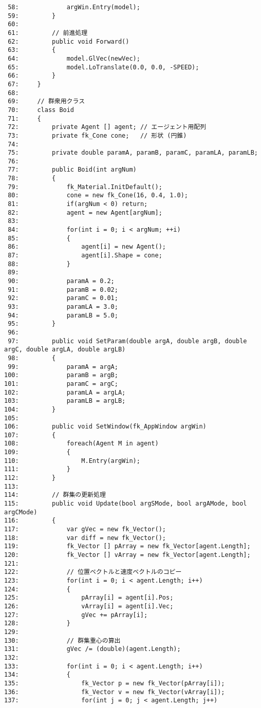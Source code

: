 \begin{breakbox}
\begin{small}
\begin{verbatim}
 58:             argWin.Entry(model);
 59:         }
 60: 
 61:         // 前進処理
 62:         public void Forward()
 63:         {
 64:             model.GlVec(newVec);
 65:             model.LoTranslate(0.0, 0.0, -SPEED);
 66:         }
 67:     }
 68: 
 69:     // 群衆用クラス
 70:     class Boid
 71:     {
 72:         private Agent [] agent; // エージェント用配列
 73:         private fk_Cone cone;   // 形状 (円錐)
 74: 
 75:         private double paramA, paramB, paramC, paramLA, paramLB;
 76: 
 77:         public Boid(int argNum)
 78:         {
 79:             fk_Material.InitDefault();
 80:             cone = new fk_Cone(16, 0.4, 1.0);
 81:             if(argNum < 0) return;
 82:             agent = new Agent[argNum];
 83: 
 84:             for(int i = 0; i < argNum; ++i)
 85:             {
 86:                 agent[i] = new Agent();
 87:                 agent[i].Shape = cone;
 88:             }
 89: 
 90:             paramA = 0.2;
 91:             paramB = 0.02;
 92:             paramC = 0.01;
 93:             paramLA = 3.0;
 94:             paramLB = 5.0;
 95:         }
 96: 
 97:         public void SetParam(double argA, double argB, double argC, double argLA, double argLB)
 98:         {
 99:             paramA = argA;
100:             paramB = argB;
101:             paramC = argC;
102:             paramLA = argLA;
103:             paramLB = argLB;
104:         }
105: 
106:         public void SetWindow(fk_AppWindow argWin)
107:         {
108:             foreach(Agent M in agent)
109:             {
110:                 M.Entry(argWin);
111:             }
112:         }
113: 
114:         // 群集の更新処理
115:         public void Update(bool argSMode, bool argAMode, bool argCMode)
116:         {
117:             var gVec = new fk_Vector();
118:             var diff = new fk_Vector();
119:             fk_Vector [] pArray = new fk_Vector[agent.Length];
120:             fk_Vector [] vArray = new fk_Vector[agent.Length];
121: 
122:             // 位置ベクトルと速度ベクトルのコピー
123:             for(int i = 0; i < agent.Length; i++)
124:             {
125:                 pArray[i] = agent[i].Pos;
126:                 vArray[i] = agent[i].Vec;
127:                 gVec += pArray[i];
128:             }
129: 
130:             // 群集重心の算出
131:             gVec /= (double)(agent.Length);
132: 
133:             for(int i = 0; i < agent.Length; i++)
134:             {
135:                 fk_Vector p = new fk_Vector(pArray[i]);
136:                 fk_Vector v = new fk_Vector(vArray[i]);
137:                 for(int j = 0; j < agent.Length; j++)

\end{verbatim}
\end{small}
\end{breakbox}
